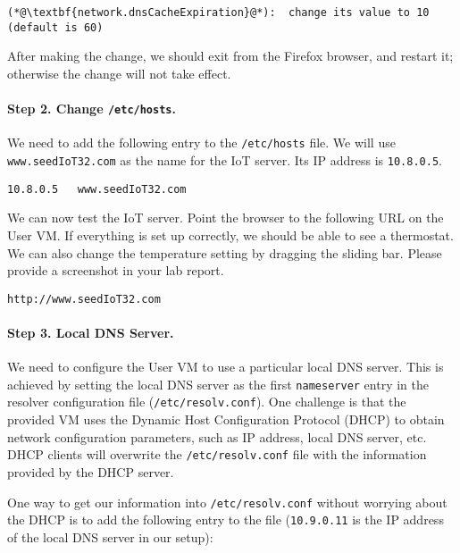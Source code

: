 \begin{lstlisting}
(*@\textbf{network.dnsCacheExpiration}@*):  change its value to 10 (default is 60)
\end{lstlisting}

After making the change, we should exit from the Firefox browser, and restart it; otherwise the
change will not take effect.


\paragraph{Step 2. Change \texttt{/etc/hosts}.}
We need to add the following entry to the \texttt{/etc/hosts} file. 
We will use \texttt{www.seedIoT32.com} as the name for the 
IoT server. Its IP address is \texttt{10.8.0.5}. 

\begin{lstlisting}
10.8.0.5   www.seedIoT32.com
\end{lstlisting}


We can now test the IoT server. Point the browser to the following URL on the 
User VM. If everything is set up correctly, we should be able to see 
a thermostat. We can also change the temperature setting by dragging the 
sliding bar. Please provide a screenshot in your lab report. 

\begin{lstlisting}
http://www.seedIoT32.com
\end{lstlisting}
 


\paragraph{Step 3. Local DNS Server.}
We need to configure the User VM to use a particular local DNS server. This is achieved by
setting the local DNS server as the first \texttt{nameserver} entry in the resolver
configuration file (\texttt{/etc/resolv.conf}). 
One challenge is that the provided VM uses the
Dynamic Host Configuration Protocol (DHCP) to obtain network configuration parameters, such as
IP address, local DNS server, etc. DHCP clients will overwrite the \texttt{/etc/resolv.conf}
file with the information provided by the DHCP server.

One way to get our information into \texttt{/etc/resolv.conf} without worrying about
the DHCP is to add the following entry to the 
file (\texttt{10.9.0.11} is the IP address of the local DNS server in our setup):

